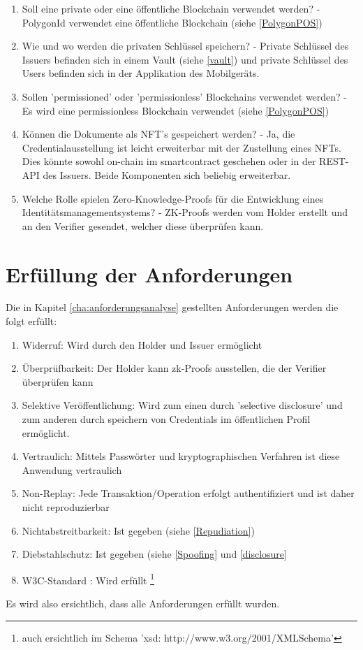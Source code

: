 \begin{enumerate}
\begin{enumerate}
		\item Soll eine private oder eine öffentliche Blockchain verwendet werden? - PolygonId verwendet eine öffentliche Blockchain (siehe \ref{PolygonPOS})
		\item Wie und wo werden die privaten Schlüssel speichern? - Private Schlüssel des Issuers befinden sich in einem Vault (siehe \ref{vault}) und private Schlüssel des Users befinden sich in der Applikation des Mobilgeräts.
		\item Sollen 'permissioned' oder 'permissionless' Blockchains verwendet werden? - Es wird eine permissionless Blockchain verwendet (siehe \ref{PolygonPOS})
		\item Können die Dokumente als NFT's gespeichert werden? - Ja, die Credentialausstellung ist leicht erweiterbar mit der Zustellung eines NFTs. Dies könnte sowohl on-chain im smartcontract geschehen oder in der REST-API des Issuers. Beide Komponenten sich beliebig erweiterbar.
		\item Welche Rolle spielen Zero-Knowledge-Proofs für die Entwicklung eines Identitätsmanagementsystems? - ZK-Proofs werden vom Holder erstellt und an den Verifier gesendet, welcher diese überprüfen kann.
	\end{enumerate}
\end{enumerate}

\section{Erfüllung der Anforderungen}
Die in Kapitel \ref{cha:anforderungsanalyse} gestellten Anforderungen werden die folgt erfüllt:
\begin{enumerate}
	\item Widerruf: Wird durch den Holder und Issuer ermöglicht
	\item Überprüfbarkeit: Der Holder kann zk-Proofs ausstellen, die der Verifier überprüfen kann
	\item Selektive Veröffentlichung: Wird zum einen durch 'selective disclosure' und zum anderen durch speichern von Credentials im öffentlichen Profil ermöglicht.
	\item Vertraulich: Mittels Passwörter und kryptographischen Verfahren ist diese Anwendung vertraulich
	\item Non-Replay: Jede Transaktion/Operation erfolgt authentifiziert und ist daher nicht reproduzierbar
	\item Nichtabstreitbarkeit: Ist gegeben (siehe \ref{Repudiation})
	\item Diebstahlschutz: Ist gegeben (siehe \ref{Spoofing} und \ref{disclosure}
	\item W3C-Standard : Wird erfüllt \footnote{auch ersichtlich im Schema 'xsd: http://www.w3.org/2001/XMLSchema'}
\end{enumerate}
Es wird also ersichtlich, dass alle Anforderungen erfüllt wurden.
